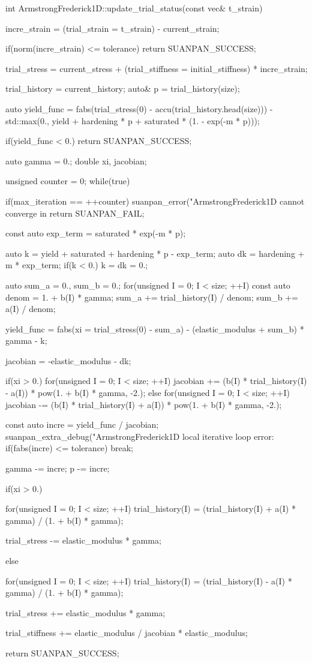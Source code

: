 \begin{cppcode}
int ArmstrongFrederick1D::update_trial_status(const vec& t_strain) {
	incre_strain = (trial_strain = t_strain) - current_strain;

	if(norm(incre_strain) <= tolerance) return SUANPAN_SUCCESS;

	trial_stress = current_stress + (trial_stiffness = initial_stiffness) * incre_strain;

	trial_history = current_history;
	auto& p = trial_history(size);

	auto yield_func = fabs(trial_stress(0) - accu(trial_history.head(size))) - std::max(0., yield + hardening * p + saturated * (1. - exp(-m * p)));

	if(yield_func < 0.) return SUANPAN_SUCCESS;

	auto gamma = 0.;
	double xi, jacobian;

	unsigned counter = 0;
	while(true) {
		if(max_iteration == ++counter) {
			suanpan_error("ArmstrongFrederick1D cannot converge in %
			return SUANPAN_FAIL;
		}

		const auto exp_term = saturated * exp(-m * p);

		auto k = yield + saturated + hardening * p - exp_term;
		auto dk = hardening + m * exp_term;
		if(k < 0.) k = dk = 0.;

		auto sum_a = 0., sum_b = 0.;
		for(unsigned I = 0; I < size; ++I) {
			const auto denom = 1. + b(I) * gamma;
			sum_a += trial_history(I) / denom;
			sum_b += a(I) / denom;
		}

		yield_func = fabs(xi = trial_stress(0) - sum_a) - (elastic_modulus + sum_b) * gamma - k;

		jacobian = -elastic_modulus - dk;

		if(xi > 0.) for(unsigned I = 0; I < size; ++I) jacobian += (b(I) * trial_history(I) - a(I)) * pow(1. + b(I) * gamma, -2.);
		else for(unsigned I = 0; I < size; ++I) jacobian -= (b(I) * trial_history(I) + a(I)) * pow(1. + b(I) * gamma, -2.);

		const auto incre = yield_func / jacobian;
		suanpan_extra_debug("ArmstrongFrederick1D local iterative loop error: %
		if(fabs(incre) <= tolerance) break;

		gamma -= incre;
		p -= incre;
	}

	if(xi > 0.) {
		for(unsigned I = 0; I < size; ++I) trial_history(I) = (trial_history(I) + a(I) * gamma) / (1. + b(I) * gamma);

		trial_stress -= elastic_modulus * gamma;
	}
	else {
		for(unsigned I = 0; I < size; ++I) trial_history(I) = (trial_history(I) - a(I) * gamma) / (1. + b(I) * gamma);

		trial_stress += elastic_modulus * gamma;
	}

	trial_stiffness += elastic_modulus / jacobian * elastic_modulus;

	return SUANPAN_SUCCESS;
}
\end{cppcode}
